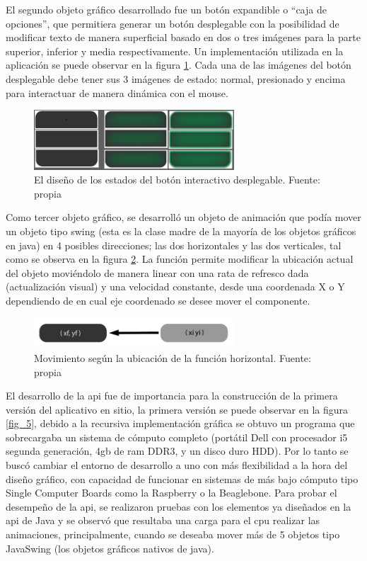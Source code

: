 El segundo objeto gráfico desarrollado fue un botón expandible o ``caja de opciones'', que permitiera generar un botón desplegable con la posibilidad de modificar texto de manera superficial basado en dos o tres imágenes para la parte superior, inferior y media respectivamente. Un implementación utilizada en la aplicación se puede observar en la figura \ref{fig_3}. Cada una de las imágenes del botón desplegable debe tener sus 3 imágenes de estado: normal, presionado y encima para interactuar de manera dinámica con el mouse.

\begin{figure}[htbp]
	\centerline{\includegraphics[width=7.5cm]{./figuras/boton_desplegable.png}}
	\caption{El diseño de los estados del botón interactivo desplegable. Fuente: propia}
	\label{fig_3}
\end{figure}

Como tercer objeto gráfico, se desarrolló un objeto de animación que podía mover un objeto tipo swing (esta es la clase madre de la mayoría de los objetos gráficos en java) en 4 posibles direcciones; las dos horizontales y las dos verticales, tal como se observa en la figura \ref{fig_4}. La función permite modificar la ubicación actual del objeto moviéndolo de manera linear con una rata de refresco dada (actualización visual) y una velocidad constante, desde una coordenada X o Y dependiendo de en cual eje coordenado se desee mover el componente.

\begin{figure}[htbp]
	\centerline{\includegraphics[width=7.5cm]{./figuras/boton_movimiento.png}}
	\caption{Movimiento según la ubicación de la función horizontal. Fuente: propia}
	\label{fig_4}
\end{figure}

El desarrollo de la api fue de importancia para la construcción de la primera versión del aplicativo en sitio, la primera versión se puede observar en la figura \ref{fig_5}, debido a la recursiva implementación gráfica se obtuvo un programa que sobrecargaba un sistema de cómputo completo (portátil Dell con procesador i5 segunda generación, 4gb de ram DDR3, y un disco duro HDD). Por lo tanto se buscó cambiar el entorno de desarrollo a uno con más flexibilidad a la hora del diseño gráfico, con capacidad de funcionar en sistemas de más bajo cómputo tipo Single Computer Boards como la Raspberry o la Beaglebone. Para probar el desempeño de la api, se realizaron pruebas con los elementos ya diseñados en la api de Java y se observó que resultaba una carga para el cpu realizar las animaciones, principalmente, cuando se deseaba mover más de 5 objetos tipo JavaSwing (los objetos gráficos nativos de java).

